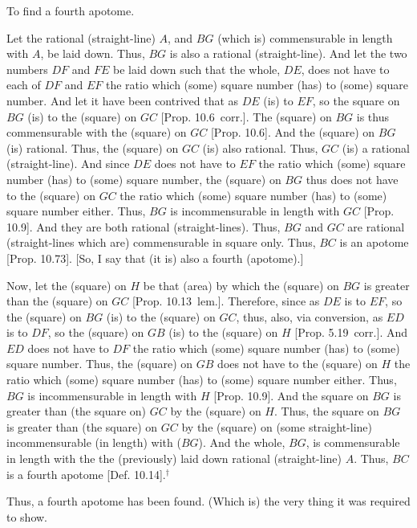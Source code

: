 \begin{Parallel}{}{}
{To find a fourth apotome.

\epsfysize=0.65in
\centerline{}

Let the rational (straight-line) $A$, and $BG$ (which is)
commensurable in length with $A$, be laid down.
Thus, $BG$ is also a rational (straight-line). And let the two numbers $DF$
and $FE$ be laid down such that the whole, $DE$, does not have to
each of $DF$ and $EF$ the ratio which (some) square number (has)
to (some) square number. And let it have been contrived that as $DE$
(is) to $EF$, so the square on $BG$ (is) to the (square) on $GC$
[Prop. 10.6~corr.]. The (square) on $BG$ is
thus commensurable with the (square) on $GC$ [Prop. 10.6]. And the (square) on $BG$ (is)
rational. Thus, the (square) on $GC$ (is) also rational. Thus, $GC$
(is) a rational (straight-line). And since $DE$ does not have to $EF$
the ratio which (some) square number (has) to (some) square number,
the (square) on $BG$ thus does not have to the (square) on $GC$ the
ratio which (some) square number (has) to (some) square number either.
Thus, $BG$ is incommensurable in length with $GC$ [Prop. 10.9]. And they are both rational (straight-lines). Thus, $BG$ and $GC$ are rational (straight-lines which are)
commensurable in square only. Thus, $BC$ is an apotome [Prop. 10.73]. [So, I say that
(it is) also a fourth (apotome).]

Now, let the (square) on $H$ be that (area) by which the (square)
on $BG$ is greater than the (square) on $GC$ [Prop. 10.13~lem.]. Therefore, since as
$DE$ is to $EF$, so the (square) on $BG$ (is) to the (square)
on $GC$, thus, also, via conversion, as $ED$ is to $DF$, so the
(square) on $GB$ (is) to the (square) on $H$ [Prop. 5.19~corr.]. And $ED$ does not have to
$DF$ the ratio which (some) square number (has) to (some) square number.
Thus, the (square) on $GB$ does not have to the (square) on $H$
the ratio which (some) square number (has) to (some) square number either.
Thus, $BG$ is incommensurable in length with $H$ [Prop. 10.9]. And the square on $BG$ is greater
than (the square on) $GC$ by the (square) on $H$. Thus, the
square on $BG$ is greater than (the square) on $GC$ by the (square)
on (some straight-line) incommensurable (in length) with ($BG$). And the whole,
$BG$, is commensurable in length with the the (previously) laid
down rational (straight-line) $A$. Thus, $BC$ is a fourth apotome
[Def. 10.14].$^\dag$

Thus, a fourth apotome has been found. (Which is) the very thing it was required to show.}
\end{Parallel}


